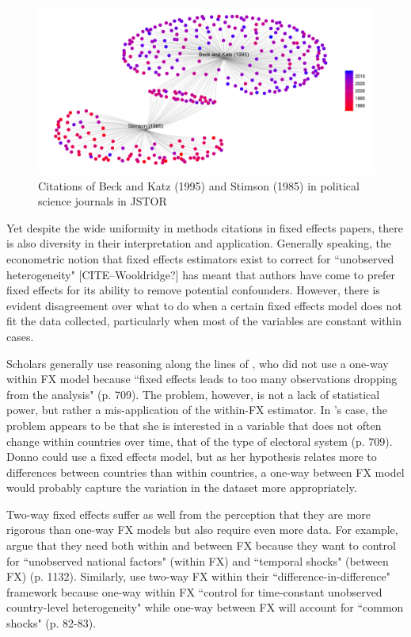 \documentclass{article}[12pt]
\begin{document}
\begin{figure}
	\centering
	\includegraphics[width=\linewidth]{stimsonkatz}
	\caption{Citations of Beck and Katz (1995) and Stimson (1985) in political science journals in JSTOR}\label{stimsonkatz}
\end{figure}

Yet despite the wide uniformity in methods citations in fixed effects papers, there is also diversity in their interpretation and application. Generally speaking, the econometric notion that fixed effects estimators exist to correct for ``unobserved heterogeneity" [CITE--Wooldridge?] has meant that authors have come to prefer fixed effects for its ability to remove potential confounders. However, there is evident disagreement over what to do when a certain fixed effects model does not fit the data collected, particularly when most of the variables are constant within cases.

Scholars generally use reasoning along the lines of \textcite{donno2013}, who did not use a one-way within FX model because ``fixed effects leads to too many observations dropping from the analysis" (p. 709). The problem, however, is not a lack of statistical power, but rather a mis-application of the within-FX estimator. In \citeauthor{donno2013}'s case, the problem appears to be that she is interested in a variable that does not often change within countries over time, that of the type of electoral system (p. 709). Donno could use a fixed effects model, but as her hypothesis relates more to differences between countries than within countries, a one-way between FX model would probably capture the variation in the dataset more appropriately.

Two-way fixed effects suffer as well from the perception that they are more rigorous than one-way FX models but also require even more data. For example, \textcite{gabel2012} argue that they need both within and between FX because they want to control for ``unobserved national factors" (within FX) and ``temporal shocks" (between FX) (p. 1132). Similarly, \textcite{scheve2012} use two-way FX within their ``difference-in-difference" framework because one-way within FX ``control for time-constant unobserved country-level heterogeneity" while one-way between FX will account for ``common shocks" (p. 82-83).
\end{document}
